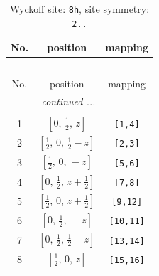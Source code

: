 \documentclass[fleqn,8pt]{jsarticle}
\begin{document}
\begin{longtable}{ccc}
\caption{Wyckoff site: {\tt 8h}, site symmetry: {\tt 2..}}
 \\
 \hline \hline
No. & position & mapping \\ \hline \endfirsthead

\multicolumn{2}{l}{\tablename\ \thetable{}} \\
 \hline \hline
No. & position & mapping \\ \hline \endhead

 \hline \hline
\multicolumn{2}{r}{\footnotesize\it continued ...} \\ \endfoot

 \hline \hline
\multicolumn{2}{r}{} \\ \endlastfoot

1 & $\left[ 0,\, \frac{1}{2},\, z \right]$ & {\tt [1,4]} \\ \hline
2 & $\left[ \frac{1}{2},\, 0,\, \frac{1}{2} - z \right]$ & {\tt [2,3]} \\ \hline
3 & $\left[ \frac{1}{2},\, 0,\, - z \right]$ & {\tt [5,6]} \\ \hline
4 & $\left[ 0,\, \frac{1}{2},\, z + \frac{1}{2} \right]$ & {\tt [7,8]} \\ \hline
5 & $\left[ \frac{1}{2},\, 0,\, z + \frac{1}{2} \right]$ & {\tt [9,12]} \\ \hline
6 & $\left[ 0,\, \frac{1}{2},\, - z \right]$ & {\tt [10,11]} \\ \hline
7 & $\left[ 0,\, \frac{1}{2},\, \frac{1}{2} - z \right]$ & {\tt [13,14]} \\ \hline
8 & $\left[ \frac{1}{2},\, 0,\, z \right]$ & {\tt [15,16]} \\
\end{longtable}
\renewcommand{\arraystretch}{1.2}
\end{document}
